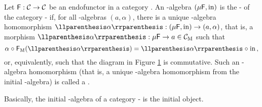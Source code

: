 \begin{definition}

  \label{def:initial-algebra}


  Let $\mathsf{F}: \mathcal{C} \to \mathcal{C}$ be an endofunctor in a category
  . An -algebra $(\mu\mathsf{F},\operatorname{in})$ is the
   - of the category -\alg
  if, for all -algebras $(a,\alpha)$, there is a unique
  -algebra homomorphism $\cata\alpha: (\mu\func{F},\inmo) \to
  (a,\alpha)$, that is, a morphism $\cata\alpha: \mu\func{F} \to a \in
  \catM{C}$ such that
  \begin{equation}
    \label{eq:cata-charn}
    \alpha \comp \funcM{F}(\cata\alpha) = \cata\alpha \comp \inmo
    \text{,}
  \end{equation}
  or, equivalently, such that the diagram in Figure
  \ref{fig:cata-charn} is commutative. Such an -algebra
  homomorphism (that is, a unique -algebra homomorphism from
  the initial -algebra) is called a .
  \begin{figure}[htbp]
    \begin{center}
    \end{center}
    \caption{}
    \label{fig:cata-charn}
  \end{figure}

  Basically, the initial -algebra of a category -\alg
  is the initial object.

\end{definition}


